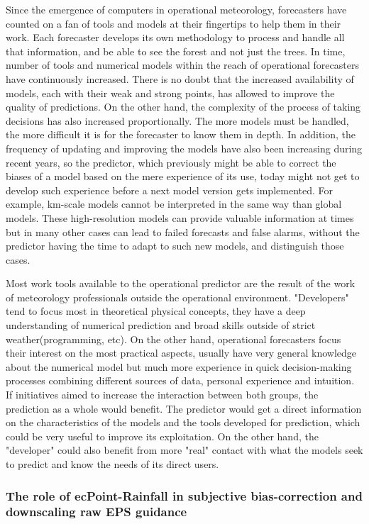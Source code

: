 \documentclass[twocol]{ametsocV5} %
\begin{document}
Since the emergence of computers in operational meteorology, forecasters have counted on a fan of tools and models at their fingertips to help them in their work. Each forecaster develops its own methodology to process and handle all that information, and be able to see the forest and not just the trees. In time, number of tools and numerical models within the reach of operational forecasters have continuously increased. There is no doubt that the increased availability of models, each with their weak and strong points, has allowed to improve the quality of predictions. On the other hand, the complexity of the process of taking decisions has also increased proportionally. The more models must be handled, the more difficult it is for the forecaster to know them in depth. In addition, the frequency of updating and improving the models have also been increasing during recent years, so the predictor, which previously might be able to correct the biases of a model based on the mere experience of its use, today might not get to develop such experience before a next model version gets implemented. For example, km-scale models cannot be interpreted in the same way than global models. These high-resolution models can provide valuable information at times but in many other cases can lead to failed forecasts and false alarms, without the predictor having the time to adapt to such new models, and distinguish those cases.

Most work tools available to the operational predictor are the result of the work of meteorology professionals outside the operational environment. "Developers" tend to focus most in theoretical physical concepts, they have a deep understanding of numerical prediction and broad skills outside of strict weather(programming, etc). On the other hand, operational forecasters focus their interest on the most practical aspects, usually have very general knowledge about the numerical model but much more experience in quick decision-making processes combining different sources of data, personal experience and intuition. If initiatives aimed to increase the interaction between both groups, the prediction as a whole would benefit. The predictor would get a direct information on the characteristics of the models and the tools developed for prediction, which could be very useful to improve its exploitation. On the other hand, the "developer" could also benefit from more "real" contact with what the models seek to predict and know the needs of its direct users.


\subsubsection{The role of ecPoint-Rainfall in subjective bias-correction and downscaling raw EPS guidance}
\end{document}
